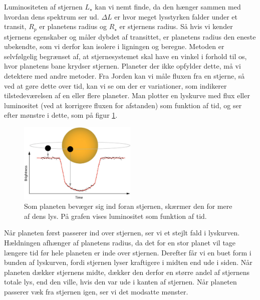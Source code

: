 Luminositeten af stjernen $L_\star $ kan vi nemt finde, da den hænger sammen med hvordan dens spektrum ser ud. $\Delta L$ er hvor meget lysstyrken falder under et transit, $R_p$ er planetens radius og $R_\star$ er stjernens radius. Så hvis vi kender stjernens egenskaber og måler dybdet af transittet, er planetens radius den eneste ubekendte, som vi derfor kan isolere i ligningen og beregne.
%
Metoden er selvfølgelig begrænset af, at stjernesystemet skal have en vinkel i forhold til os, hvor planetens bane krydser stjernen. Planeter der ikke opfylder dette, må vi detektere med andre metoder.
%
Fra Jorden kan vi måle fluxen fra en stjerne, så ved at gøre dette over tid, kan vi se om der er variationer, som indikerer tilstedeværelsen af en eller flere planeter. Man plotter en lyskurve med flux eller luminositet (ved at korrigere fluxen for afstanden) som funktion af tid, og ser efter mønstre i dette, som på figur \ref{transit}.
%
\begin{figure}
    \centering
    \includegraphics[width = 0.5\textwidth]{Astrofysik/billeder/transit.png}  
    \caption{Som planeten bevæger sig ind foran stjernen, skærmer den for mere af dens lys. På grafen vises luminositet som funktion af tid.}
    \label{transit}
\end{figure}
%
Når planeten først passerer ind over stjernen, ser vi et stejlt fald i lyskurven. Hældningen afhænger af planetens radius, da det for en stor planet vil tage længere tid før hele planeten er inde over stjernen. 
%
Derefter får vi en buet form i bunden af lyskurven, fordi stjernen lyser kraftigere i midten end ude i siden. Når planeten dækker stjernens midte, dækker den derfor en større andel af stjernens totale lys, end den ville, hvis den var ude i kanten af stjernen.
Når planeten passerer væk fra stjernen igen, ser vi det modsatte mønster. \\

